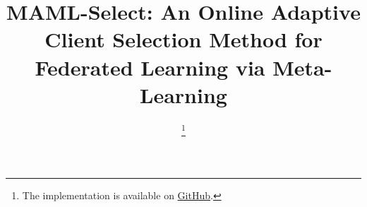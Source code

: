 \documentclass[journal]{IEEEtran}
\theoremstyle{remark}
\newcommand{\codeurl}{https://github.com/Advait-Pathak9222/MAML-Select-Algorithm}
\begin{document}
\title{MAML-Select: An Online Adaptive Client Selection Method for Federated Learning via Meta-Learning}


\author{\thanks{The implementation is available on \protect\href{\codeurl}{GitHub}.}}
\maketitle

\end{document}
